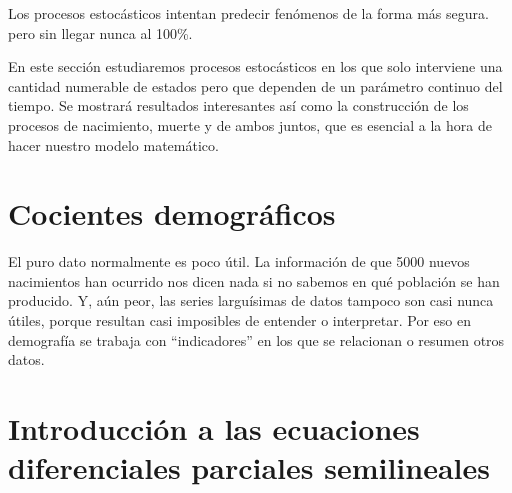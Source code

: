 \documentclass[a4paper,11pt]{book}
\begin{document}
    Los procesos estocásticos intentan predecir fenómenos de la forma más segura. pero sin llegar nunca al 100\%.
    
    En este sección estudiaremos procesos estocásticos en los que solo interviene una cantidad numerable de estados pero que dependen de un parámetro continuo del tiempo. Se mostrará resultados interesantes así como la construcción de los procesos de nacimiento, muerte y de ambos juntos, que es esencial a la hora de hacer nuestro modelo matemático.
    
    
    
    
    
\chapter{Cocientes demográficos}
    El puro dato normalmente es poco útil. La información de que 5000 nuevos nacimientos han ocurrido nos dicen nada si no sabemos en qué población se han producido. Y, aún peor, las series larguísimas de datos tampoco son casi nunca útiles, porque resultan casi imposibles de entender o interpretar. Por eso en demografía se trabaja con “indicadores” en los que se relacionan o resumen otros datos.
    
    

\chapter{Introducción a las ecuaciones diferenciales parciales semilineales}

    
    
    
    
\end{document}
